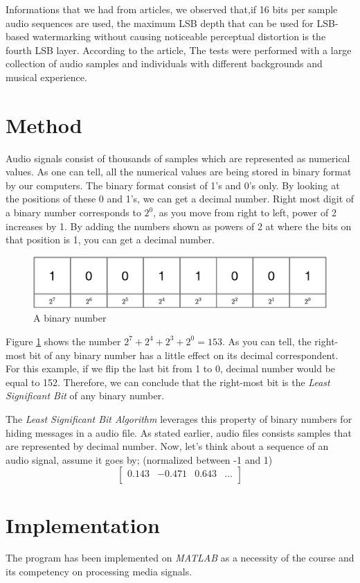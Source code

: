 \documentclass[twocolumns]{IEEEtran}
\begin{document}
	
	Informations that we had from articles, we observed that,if
	16 bits per sample audio sequences are used,  the maximum LSB depth that
	can be used for LSB-based watermarking without causing
	noticeable perceptual distortion is the fourth LSB layer. According to the article, The tests
	were performed with a large collection of audio samples
	and individuals with different backgrounds and musical
	experience.
	
	\section{Method}
	Audio signals consist of thousands of samples which are represented as numerical values. As one can tell, all the numerical values are being stored in binary format by our computers. The binary format consist of 1's and 0's only. By looking at the positions of these 0 and 1's, we can get a decimal number. Right most digit of a binary number corresponds to $2^0$, as you move from right to left, power of 2 increases by 1. By adding the numbers shown as powers of 2 at where the bits on that position is 1, you can get a decimal number.
	\begin{figure}[h]
		\centering
		\includegraphics[scale=.5]{binary_num.eps}
		\caption{A binary number}
		\label{fig:binary}
	\end{figure}

	Figure \ref{fig:binary} shows the number $2^7 + 2^4 + 2^3 + 2^0 = 153$. As you can tell, the right-most bit of any binary number has a little effect on its decimal correspondent. For this example, if we flip the last bit from 1 to 0, decimal number would be equal to 152. Therefore, we can conclude that the right-most bit is the \textit{Least Significant Bit} of any binary number.
	
	The \textit{Least Significant Bit Algorithm} leverages this property of binary numbers for hiding messages in a audio file. As stated earlier, audio files consists samples that are represented by decimal number. Now, let's think about a sequence of an audio signal, assume it goes by; (normalized between -1 and 1)\\
	\begin{equation}
	\begin{bmatrix}
		0.143 & -0.471 & 0.643 & \hdots \\
	\end{bmatrix}
	\end{equation}

	\section{Implementation}
	The program has been implemented on \textit{MATLAB} as a necessity of the course and its competency on processing media signals.
	
	
	
\end{document}
